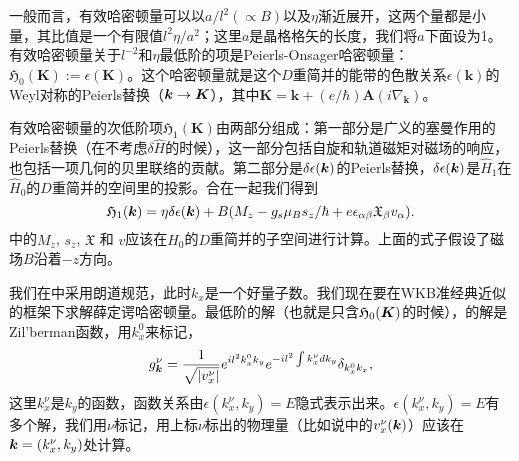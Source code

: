 \begin{appendices}
一般而言，有效哈密顿量可以以$a/l^2 (\propto B)$以及$\eta$渐近展开，这两个量都是小量，其比值是一个有限值$l^2\eta/a^2$；这里$a$是晶格格矢的长度，我们将$a$下面设为1。有效哈密顿量关于$l^{-2}$和$\eta$最低阶的项是Peierls-Onsager哈密顿量：$\mathfrak{H}_{0}(\boldsymbol{K}):=\epsilon(\boldsymbol{K})$。这个哈密顿量就是这个$D$重简并的能带的色散关系$\epsilon(\boldsymbol{k})$的Weyl对称的Peierls替换（$\boldsymbol{k} \rightarrow \boldsymbol{K}$），其中$\boldsymbol{K}=\boldsymbol{k}+(e/\hbar)\boldsymbol{A}(i\nabla_{\boldsymbol{k}})$。

有效哈密顿量的次低阶项$\mathfrak{H}_{1}(\boldsymbol{K})$由两部分组成：第一部分是广义的塞曼作用的Peierls替换（在不考虑$\delta \hat{H}$的时候），这一部分包括自旋和轨道磁矩对磁场的响应，也包括一项几何的贝里联络的贡献。第二部分是$\delta \epsilon(\boldsymbol{k})$的Peierls替换，$\delta \epsilon(\boldsymbol{k})$是$\hat{H}_1$在$\hat{H}_0$的$D$重简并的空间里的投影。合在一起我们得到
\begin{equation}
\mathfrak{H}_1(\boldsymbol{k}) = \eta\delta \epsilon(\boldsymbol{k})+B(M_{z}-g_s\mu_{B}s_{z}/\hbar+e\epsilon_{\alpha\beta}\mathfrak{X}_{\beta}v_{\alpha}). \label{effham1}
\end{equation}
中的$M_z$, $s_z$, $\mathfrak{X}$ 和 $v$应该在$\hat{H}_0$的$D$重简并的子空间进行计算。上面的式子假设了磁场$B$沿着$-z$方向。

我们在中采用朗道规范，此时$k_x$是一个好量子数。我们现在要在WKB准经典近似的框架下求解薛定谔哈密顿量。最低阶的解（也就是只含$\mathfrak{H}_0(\boldsymbol{K})$的时候），的解是Zil'berman函数\cite{zilberman}，用$k_x^0$来标记，
\begin{equation}
    g_{\bk}^\nu=\frac{1}{\sqrt{|v_x^\nu|}}e^{il^2k_x^0k_y}e^{-il^{2}\int k_x^\nu dk_y}\delta_{k_x^0 k_x},\la{zilberman}
\end{equation}
这里$k_x^\nu$是$k_y$的函数，函数关系由$\epsilon(k_x^\nu,k_y)=E$隐式表示出来。$\epsilon(k_x^\nu,k_y)=E$有多个解，我们用$\nu$标记，用上标$\nu$标出的物理量（比如说中的$v_x^\nu(\boldsymbol{k})$）应该在$\boldsymbol{k} = (k_x^\nu, k_y)$处计算。


\end{appendices}
